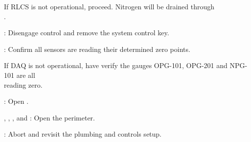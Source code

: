 \begin{checklist}
\begin{checklist}[label=$\bullet$]
    \item If RLCS is not operational, proceed. Nitrogen will be drained through \\ \phantom{} \hspace{8ex} \pdrain{}. 
    \end{checklist}
\item \rlcs{}: Disengage control and remove the system control key. 
\item \daq{}: Confirm all sensors are reading their determined zero points. 
\begin{checklist}[label=$\bullet$]
    \item If DAQ is not operational, have \primary{} verify the gauges OPG-101, OPG-201 and NPG-101 are all \\ \phantom{} \hspace{8ex} reading zero. 
    \end{checklist}
\item \primary{}: Open \pdrain{}.
\item \peri{}, \perii{}, \periii{}, and \periv{}: Open the perimeter.
\item \ops{}: Abort and revisit the plumbing and controls setup. 
\end{checklist}


\newpage
